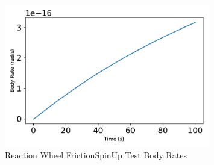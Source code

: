 \begin{figure}[htbp]\centerline{\includegraphics[width=0.8\textwidth]{AutoTeX/ReactionWheelFrictionSpinUpTestBodyRates}}\caption{Reaction Wheel FrictionSpinUp Test Body Rates}\label{fig:ReactionWheelFrictionSpinUpTestBodyRates}\end{figure}